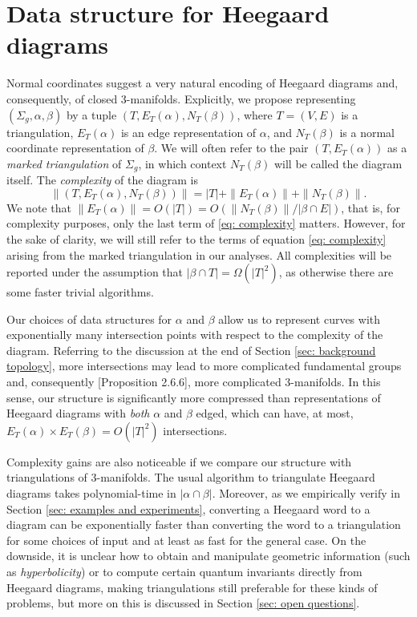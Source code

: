 \documentclass[11pt]{amsart}
\numberwithin{equation}{section}
\theoremstyle{plain}
\theoremstyle{definition}
\begin{document}
\section{Data structure for Heegaard diagrams}\label{sec: data structure}
Normal coordinates suggest a very natural encoding of Heegaard diagrams and, consequently, of closed 3-manifolds.
Explicitly, we propose representing $(\Sigma_g, \alpha, \beta)$ by a tuple $(T,E_T(\alpha), N_T(\beta))$, where $T=(V,E)$ is a triangulation, $E_T(\alpha)$ is an edge representation of $\alpha$, and $N_T(\beta)$ is a normal coordinate representation of $\beta$. 
We will often refer to the pair $(T,E_T(\alpha))$ as a \textit{marked triangulation} of $\Sigma_g$, in which context $N_T(\beta)$ will be called the diagram itself.
The \textit{complexity} of the diagram is
\begin{equation}\label{eq: complexity}
    \|(T,E_T(\alpha),N_T(\beta))\|=|T|+\|E_T(\alpha)\|+\|N_T(\beta)\|.
\end{equation}
We note that $\|E_T(\alpha)\| = O(|T|)=O(\|N_T(\beta)\|/|\beta\cap E|)$, that is, for complexity purposes, only the last term of \eqref{eq: complexity} matters.
However, for the sake of clarity, we will still refer to the terms of equation \eqref{eq: complexity} arising from the marked triangulation in our analyses.
All complexities will be reported under the assumption that $|\beta\cap T|=\Omega(|T|^2)$, as otherwise there are some faster trivial algorithms.

Our choices of data structures for $\alpha$ and $\beta$ allow us to represent curves with exponentially many intersection points with respect to the complexity of the diagram.
Referring to the discussion at the end of Section \ref{sec: background topology}, more intersections may lead to more complicated fundamental groups and, consequently \cite{matveev2007algorithmic}[Proposition 2.6.6], more complicated 3-manifolds.
In this sense, our structure is significantly more {compressed} than representations of Heegaard diagrams with \emph{both} $\alpha$ and $\beta$ edged, which can have, at most, $E_T(\alpha)\times E_T(\beta)=O(|T|^2)$ intersections. 

Complexity gains are also noticeable if we compare our structure with triangulations of 3-manifolds. 
The usual algorithm to triangulate Heegaard diagrams \cite{he2023algorithm} takes polynomial-time in $|\alpha\cap \beta|$. 
Moreover, as we empirically verify in Section \ref{sec: examples and experiments}, converting a Heegaard word to a diagram can be exponentially faster than converting the word to a triangulation for some choices of input and at least as fast for the general case. 
On the downside, it is unclear how to obtain and manipulate geometric information (such as \emph{hyperbolicity}) or to compute certain quantum invariants directly from Heegaard diagrams, making triangulations still preferable for these kinds of problems, but more on this is discussed in Section \ref{sec: open questions}.
\end{document}
